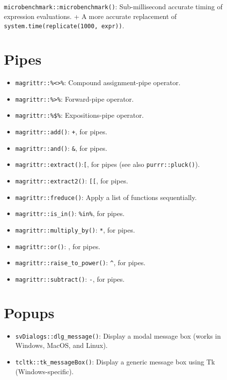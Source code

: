 \documentclass[
]{book}
\providecommand{\tightlist}{%
  \setlength{\itemsep}{0pt}\setlength{\parskip}{0pt}}
\begin{document}
\texttt{microbenchmark::microbenchmark()}: Sub-millisecond accurate timing of expression evaluations.
+ A more accurate replacement of \texttt{system.time(replicate(1000,\ expr))}.

\hypertarget{pipes}{%
\section{Pipes}\label{pipes}}

\begin{itemize}
\tightlist
\item
  \texttt{magrittr::\%\textless{}\textgreater{}\%}: Compound assignment-pipe operator.
\item
  \texttt{magrittr::\%\textgreater{}\%}: Forward-pipe operator.
\item
  \texttt{magrittr::\%\$\%}: Expositions-pipe operator.
\item
  \texttt{magrittr::add()}: \texttt{+}, for pipes.
\item
  \texttt{magrittr::and()}: \texttt{\&}, for pipes.
\item
  \texttt{magrittr::extract()}:\texttt{{[}}, for pipes (see also \texttt{purrr::pluck()}).
\item
  \texttt{magrittr::extract2()}: \texttt{{[}{[}}, for pipes.
\item
  \texttt{magrittr::freduce()}: Apply a list of functions sequentially.
\item
  \texttt{magrittr::is\_in()}: \texttt{\%in\%}, for pipes.
\item
  \texttt{magrittr::multiply\_by()}: \texttt{*}, for pipes.
\item
  \texttt{magrittr::or()}: \texttt{\textbar{}}, for pipes.
\item
  \texttt{magrittr::raise\_to\_power()}: \texttt{\^{}}, for pipes.
\item
  \texttt{magrittr::subtract()}: \texttt{-}, for pipes.
\end{itemize}

\hypertarget{popups}{%
\section{Popups}\label{popups}}

\begin{itemize}
\tightlist
\item
  \texttt{svDialogs::dlg\_message()}: Display a modal message box (works in Windows, MacOS, and Linux).
\item
  \texttt{tcltk::tk\_messageBox()}: Display a generic message box using Tk (Windows-specific).
\end{itemize}
\end{document}
